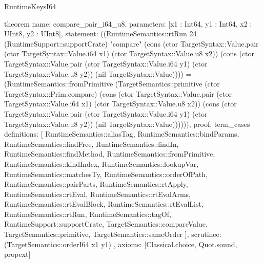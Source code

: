 \begin{lexlean}{RuntimeKeysI64}
\begin{semanticmodule}
theorem{
  name: compare_pair_i64_u8,
  parameters: [x1 : Int64, y1 : Int64, x2 : UInt8, y2 : UInt8],
  statement: ((RuntimeSemantics::rtRun 24 (RuntimeSupport::supportCrate) "compare" (cons (ctor TargetSyntax::Value.pair (ctor TargetSyntax::Value.i64 x1) (ctor TargetSyntax::Value.u8 x2)) (cons (ctor TargetSyntax::Value.pair (ctor TargetSyntax::Value.i64 y1) (ctor TargetSyntax::Value.u8 y2)) (nil TargetSyntax::Value)))) = (RuntimeSemantics::fromPrimitive (TargetSemantics::primitive (ctor TargetSyntax::Prim.compare) (cons (ctor TargetSyntax::Value.pair (ctor TargetSyntax::Value.i64 x1) (ctor TargetSyntax::Value.u8 x2)) (cons (ctor TargetSyntax::Value.pair (ctor TargetSyntax::Value.i64 y1) (ctor TargetSyntax::Value.u8 y2)) (nil TargetSyntax::Value)))))),
  proof: term_cases{
    definitions: [
      RuntimeSemantics::aliasTag,
      RuntimeSemantics::bindParams,
      RuntimeSemantics::findFree,
      RuntimeSemantics::findIn,
      RuntimeSemantics::findMethod,
      RuntimeSemantics::fromPrimitive,
      RuntimeSemantics::kindIndex,
      RuntimeSemantics::lookupVar,
      RuntimeSemantics::matchesTy,
      RuntimeSemantics::orderOfPath,
      RuntimeSemantics::pairParts,
      RuntimeSemantics::rtApply,
      RuntimeSemantics::rtEval,
      RuntimeSemantics::rtEvalArms,
      RuntimeSemantics::rtEvalBlock,
      RuntimeSemantics::rtEvalList,
      RuntimeSemantics::rtRun,
      RuntimeSemantics::tagOf,
      RuntimeSupport::supportCrate,
      TargetSemantics::compareValue,
      TargetSemantics::primitive,
      TargetSemantics::sameOrder
    ],
    scrutinee: (TargetSemantics::orderI64 x1 y1)
  },
  axioms: [Classical.choice, Quot.sound, propext]
}


\end{semanticmodule}
\end{lexlean}
